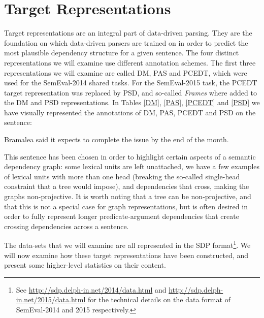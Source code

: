 \section{Target Representations}
\label{sec:representations}

Target representations are an integral part of data-driven parsing. They are the foundation on which data-driven parsers are trained on in order to predict the most plausible dependency structure for a given sentence. The four distinct representations we will examine use different annotation schemes. The first three representations we will examine are called DM, PAS and PCEDT, which were used for the SemEval-2014 shared tasks. For the SemEval-2015 task, the PCEDT target representation was replaced by PSD, and so-called \textit{Frames} where added to the DM and PSD representations. In Tables \ref{DM}, \ref{PAS}, \ref{PCEDT} and \ref{PSD} we have visually represented the annotations of DM, PAS, PCEDT and PSD on the sentence:

\begin{displayquote}
Bramalea said it expects to complete the issue by the end of the month.
\end{displayquote}

This sentence has been chosen in order to highlight certain aspects of a semantic dependency graph: some lexical units are left unattached, we have a few examples of lexical units with more than one head (breaking the so-called single-head constraint that a tree would impose), and dependencies that cross, making the graphs non-projective. It is worth noting that a tree can be non-projective, and that this is not a special case for graph representations, but is often desired in order to fully represent longer predicate-argument dependencies that create crossing dependencies across a sentence.

The data-sets that we will examine are all represented in the SDP format\footnote{See \url{http://sdp.delph-in.net/2014/data.html} and \url{http://sdp.delph-in.net/2015/data.html} for the technical details on the data format of SemEval-2014 and 2015 respectively.}. We will now examine how these target representations have been constructed, and present some higher-level statistics on their content.


